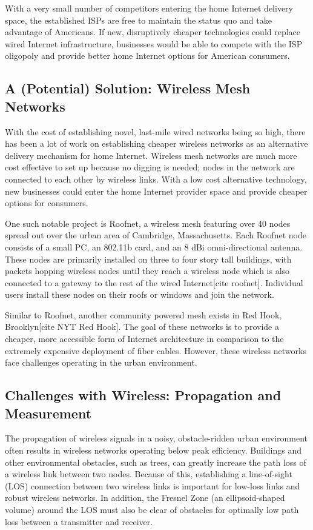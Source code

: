 \documentclass[pageno]{jpaper}
\begin{document}
With a very small number of competitors entering the home Internet delivery space, the established ISPs are free to maintain the status quo and take advantage of Americans. If new, disruptively cheaper technologies could replace wired Internet infrastructure, businesses would be able to compete with the ISP oligopoly and provide better home Internet options for American consumers.

\subsection{A (Potential) Solution: Wireless Mesh Networks}
With the cost of establishing novel, last-mile wired networks being so high, there has been a lot of work on establishing cheaper wireless networks as an alternative delivery mechanism for home Internet. Wireless mesh networks are much more cost effective to set up because no digging is needed; nodes in the network are connected to each other by wireless links. With a low cost alternative technology, new businesses could enter the home Internet provider space and provide cheaper options for consumers. 

 One such notable project is Roofnet, a wireless mesh featuring over 40 nodes spread out over the urban area of Cambridge, Massachusetts. Each Roofnet node consists of a small PC, an 802.11b card, and an 8 dBi omni-directional antenna. These nodes are primarily installed on three to four story tall buildings, with packets hopping wireless nodes until they reach a wireless node which is also connected to a gateway to the rest of the wired Internet[cite roofnet]. Individual users install these nodes on their roofs or windows and join the network. 

Similar to Roofnet, another community powered mesh exists in Red Hook, Brooklyn[cite NYT Red Hook]. The goal of these networks is to provide a cheaper, more accessible form of Internet architecture in comparison to the extremely expensive deployment of fiber cables. However, these wireless networks face challenges operating in the urban environment.

\subsection{Challenges with Wireless: Propagation and Measurement}
The propagation of wireless signals in a noisy, obstacle-ridden urban environment often results in wireless networks operating below peak efficiency. Buildings and other environmental obstacles, such as trees, can greatly increase the path loss of a wireless link between two nodes. Because of this, establishing a line-of-sight (LOS) connection between two wireless links is important for low-loss links and robust wireless networks. In addition, the Fresnel Zone (an ellipsoid-shaped volume) around the LOS must also be clear of obstacles for optimally low path loss between a transmitter and receiver. 
\end{document}
